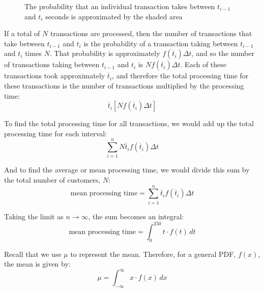 \begin{figure}[H]
    \centering
    \label{fig:mean}
    \caption{The probability that an individual transaction takes between 
    $t_{i-1}$ and $t_i$ seconds is approximated by the shaded area}
\end{figure}

If a total of $N$ transactions are processed, then the number of transactions 
that take between $t_{i-1}$ and $t_i$ is the probability of a transaction 
taking between $t_{i-1}$ and $t_i$ times $N$. That probability is approximately $f(\overline{t}_i) \Delta t$, and so the number of transactions taking between 
$t_{i-1}$ and $t_i$ is $Nf(\overline{t}_i) \Delta t$. Each of these 
transactions took approximately $\overline{t}_i$, and therefore the total 
processing time for these transactions is the number of transactions multiplied
by the processing time:
$$\overline{t}_i \left[ N f(\overline{t}_i) \Delta t \right]$$

To find the total processing time for all transactions, we would add up the 
total processing time for each interval:
$$\sum_{i = 1}^n N \overline{t}_i f(\overline{t}_i) \Delta t$$

And to find the average or mean processing time, we would divide this sum by 
the total number of customers, $N$:
$$\text{mean processing time} = \sum_{i = 1}^n \overline{t}_i f(\overline{
t}_i) \Delta t$$

Taking the limit as $n \to \infty$, the sum becomes an integral:
$$\text{mean processing time} = \int_0^{250} t \cdot f(t)\,dt$$

Recall that we use $\mu$ to represent the mean. Therefore, for a general PDF, 
$f(x)$, the mean is given by:
$$\mu = \int_{-\infty}^{\infty} x \cdot f(x)\,dx$$

